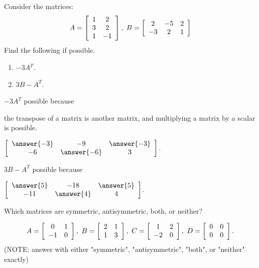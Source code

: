 \documentclass{ximera}
\author{Zack Reed}
\begin{document}
\begin{exercise}
  Consider the matrices:
  \begin{equation*}
    A = \startmat{cc}
      1 & 2 \\
      3 & 2 \\
      1 & -1
    \stopmat,
    \quad
    B = \startmat{ccc}
      2 & -5 & 2 \\
      -3 & 2 & 1
    \stopmat
  \end{equation*}
  Find the following if possible.
  \begin{enumerate}
  \item $-3A{^T}$.
  \item $3B - A^T$.
  \end{enumerate}

  $-3A^T$  possible because

  \begin{problem}
    the transpose of a matrix is another matrix, and multiplying a matrix by a scalar is possible.


$\startmat{ccc}
        \answer{-3} & -9 & \answer{-3} \\
        -6 & \answer{-6} & 3
      \stopmat$.
\end{problem}

$3B - A^T$  possible because

  \begin{problem}
\begin{selectAll}
\end{selectAll}

$\startmat{ccc}
        \answer{5} & -18 & \answer{5} \\
        -11 & \answer{4} & 4
      \stopmat$.
      \end{problem}



  Which matrices are symmetric, antisymmetric, both,
  or neither?

  \begin{equation*}
    A = \startmat{cc}
      0 & 1 \\
      -1 & 0
    \stopmat,
    \quad
    B = \startmat{cc}
      2 & 1 \\
      1 & 3
    \stopmat,
    \quad
    C = \startmat{cc}
      1 & 2 \\
      -2 & 0
    \stopmat,
    \quad
    D = \startmat{cc}
      0 & 0 \\
      0 & 0
    \stopmat.
  \end{equation*}
  (NOTE: answer with either "symmetric", "antisymmetric", "both", or "neither" exactly)


\end{exercise}
\end{document}
